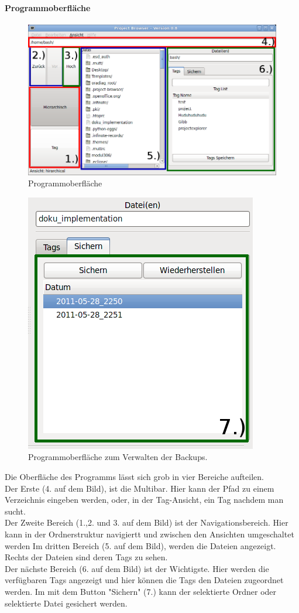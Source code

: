 \documentclass[10pt,paper=a4,final]{scrartcl}
\begin{document}
\paragraph{Programmoberfl\"ache}
\begin{figure}[h!]
\includegraphics[scale=0.5]{gui1.png}
\caption{Programmoberfl\"ache}
\end{figure}
\begin{figure}[h!]
\includegraphics[scale=0.5]{gui2.png}
\caption{Programmoberfl\"ache zum Verwalten der Backups.}
\end{figure}
Die Oberfl\"ache des Programms l\"asst sich grob in vier Bereiche aufteilen.\\
Der Erste (4. auf dem Bild), ist die Multibar. Hier kann der Pfad zu einem Verzeichnis eingeben werden, oder, in der Tag-Ansicht, ein Tag nachdem man sucht.\\
Der Zweite Bereich (1.,2. und 3. auf dem Bild) ist der Navigationsbereich. Hier kann in der Ordnerstruktur navigiertt und zwischen den Ansichten umgeschaltet werden Im dritten Bereich (5. auf dem Bild), werden die Dateien angezeigt. Rechts der Dateien sind deren Tags zu sehen.\\
Der nächste Bereich (6. auf dem Bild) ist der Wichtigste. Hier werden die verf\"ugbaren Tags angezeigt und hier k\"onnen die Tags den Dateien zugeordnet werden. Im mit dem Button "Sichern" (7.) kann der selektierte Ordner oder selektierte Datei gesichert werden.\\
\end{document}
